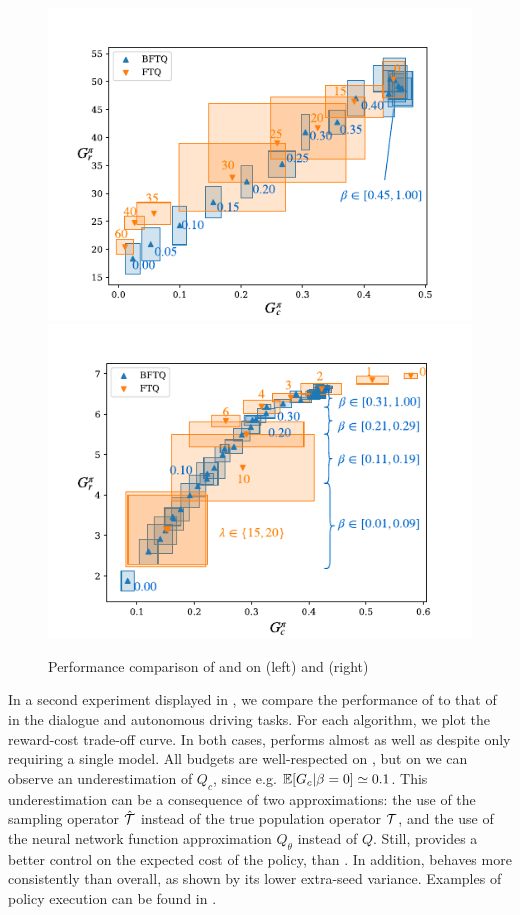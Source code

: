 \documentclass{article}
\begin{document}
\begin{figure}[tp]
    \begin{center}
    \includegraphics[width=0.49\linewidth]{source/img/slot-filling}
    \includegraphics[width=0.49\linewidth]{source/img/highway}
    \caption{Performance comparison of \FTQl and \BFTQ on  (left) and (right) }
    \label{fig:results}
    \end{center}
\end{figure}

In a second experiment displayed in , we compare the performance of \FTQl to that of \BFTQ in the dialogue and autonomous driving tasks. For each algorithm, we plot the reward-cost trade-off curve. In both cases, \BFTQ performs almost as well as \FTQl despite only requiring a single model. All budgets are well-respected on , but on  we can observe an underestimation of $Q_c$, since e.g. $\operatorname*{\mathbb{E}}[G_c|\beta=0] \simeq 0.1 $. This underestimation can be a consequence of two approximations: the use of the sampling operator $\hat{\mathcal{T}}$ instead of the true population operator $\mathcal{T}$, and the use of the neural network function approximation $Q_\theta$ instead of $Q$. 
Still, \BFTQ provides a better control on the expected cost of the policy, than \FTQl. In addition, \BFTQ behaves more consistently than \FTQl overall, as shown by its lower extra-seed variance. Examples of policy execution can be found in .
\end{document}
